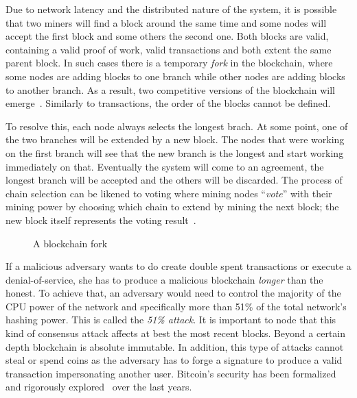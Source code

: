 Due to network latency and the distributed nature of the system, it is possible that two miners will find a block around the same time and some nodes will accept the first block and some others the second one. Both blocks are valid, containing a valid proof of work, valid transactions and both extent the same parent block. In such cases there is a temporary \textit{fork} in the blockchain, where some nodes are adding blocks to one branch while other nodes are adding blocks to another branch. As a result, two competitive versions of the blockchain will emerge~\cite{antonopoulos2014mastering}. Similarly to transactions, the order of the blocks cannot be defined.

To resolve this, each node always selects the longest brach. At some point, one of the two branches will be extended by a new block. The nodes that were working on the first branch will see that the new branch is the longest and start working immediately on that. Eventually the system will come to an agreement, the longest branch will be accepted and the others will be discarded. The process of chain selection can be likened to voting where mining nodes ``\textit{vote}'' with their mining power by choosing which chain to extend by mining the next block; the new block itself represents the voting result~\cite{antonopoulos2014mastering}.

\begin{figure}[!ht]
  \centering
  \caption{A blockchain fork}
  \label{fig:bl:fork}
\end{figure}

If a malicious adversary wants to do create double spent transactions or execute a denial-of-service, she has to produce a malicious blockchain \textit{longer} than the honest. To achieve that, an adversary would need to control the majority of the CPU power of the network and specifically more than 51\% of the total network’s hashing power. This is called the \textit{51\% attack}. It is important to node that this kind of consensus attack affects at best the most recent blocks. Beyond a certain depth blockchain is absolute immutable. In addition, this type of attacks cannot steal or spend coins as the adversary has to forge a signature to produce a valid transaction impersonating another user. Bitcoin's security has been formalized and rigorously explored~\cite{10.1007/978-3-662-46803-6_10} over the last years.

